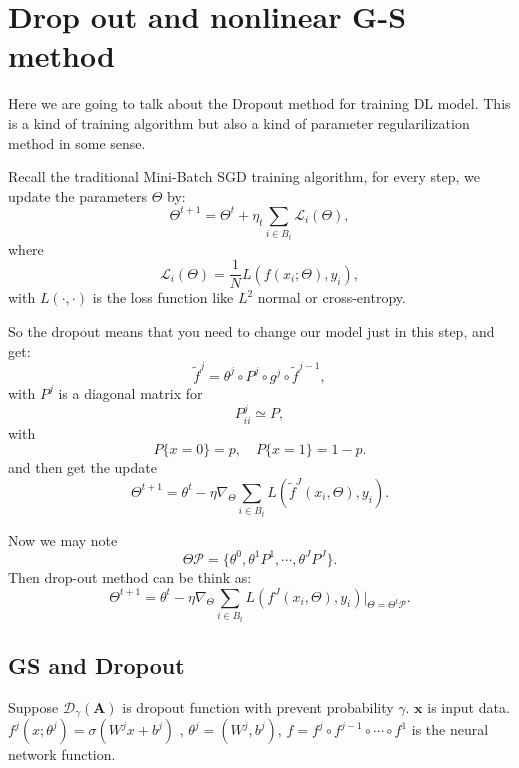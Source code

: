 \section{Drop out and nonlinear G-S method}

Here we are going to talk about the Dropout method for training DL model. This is a kind of training algorithm but also a kind of parameter regularilization method in some sense. 

Recall the traditional Mini-Batch SGD training algorithm, for every step, we update the parameters $\Theta$ by:
\begin{equation}
\Theta^{t+1} = \Theta^t + \eta_t \sum_{i \in B_t} \mathcal{L}_i(\Theta),
\end{equation} 
where 
\begin{equation}
 \mathcal{L}_i(\Theta) = \frac{1}{N} L(f(x_i ;\Theta) ,y_i),
\end{equation}
with $L(\cdot, \cdot)$ is the loss function like $L^2$ normal or cross-entropy.

So the dropout means that you need to change our model just in this step, and get:
\begin{equation}
\tilde{f}^{j} = \theta^j \circ P^j \circ g^j \circ \tilde f^{j-1},
\end{equation}
with $P^j$ is a diagonal matrix for 
\begin{equation}
P^j_{ii} \simeq P,
\end{equation}
with
\begin{equation}
P\{x = 0 \} = p, \quad P\{x = 1 \} = 1-p.
\end{equation}
and then get the update
\begin{equation}
\Theta^{t+1} = \theta^{t} - \eta \nabla_{\Theta} \sum_{i \in B_t} L(\tilde f^J(x_i, \Theta), y_i).
\end{equation}

Now we may note 
\begin{equation}
\Theta \mathcal{P}  = \{\theta^0, \theta^1 P^1, \cdots, \theta^{J}P^J\}.
\end{equation}
Then drop-out method can be think as:
\begin{equation}
\Theta^{t+1} = \theta^{t} - \eta \nabla_{\Theta} \sum_{i \in B_t} L(f^J(x_i, \Theta), y_i) |_{\Theta = \Theta^t \mathcal{P}}.
\end{equation}


\subsection{GS and Dropout}
Suppose $\mathcal D_\gamma(\mathbf A)$ is dropout function with prevent probability $\gamma$. $\mathbf x$ is input data. $f^j(x;\theta^j)=\sigma(W^jx+b^j)$ , $\theta^j=(W^j,b^j)$, $f=f^j\circ f^{j-1}\circ \cdots \circ f^1$ is the neural network function.
